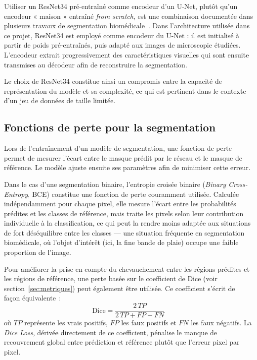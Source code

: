 \documentclass[12pt,a4paper]{report}
\begin{document}
Utiliser un ResNet34 pré-entraîné comme encodeur d'un U-Net, plutôt qu'un encodeur « maison » entraîné \textit{from scratch}, est une combinaison documentée dans plusieurs travaux de segmentation biomédicale~\cite{ref3,ref4}. Dans l'architecture utilisée dans ce projet, ResNet34 est employé comme encodeur du U-Net : il est initialisé à partir de poids pré-entraînés, puis adapté aux images de microscopie étudiées. L'encodeur extrait progressivement des caractéristiques visuelles qui sont ensuite transmises au décodeur afin de reconstruire la segmentation.

Le choix de ResNet34 constitue ainsi un compromis entre la capacité de représentation du modèle et sa complexité, ce qui est pertinent dans le contexte d'un jeu de données de taille limitée.

\subsection{Fonctions de perte pour la segmentation}

Lors de l'entraînement d'un modèle de segmentation, une fonction de perte permet de mesurer l'écart entre le masque prédit par le réseau et le masque de référence. Le modèle ajuste ensuite ses paramètres afin de minimiser cette erreur.

Dans le cas d'une segmentation binaire, l'entropie croisée binaire (\textit{Binary Cross-Entropy}, BCE) constitue une fonction de perte couramment utilisée. Calculée indépendamment pour chaque pixel, elle mesure l'écart entre les probabilités prédites et les classes de référence, mais traite les pixels selon leur contribution individuelle à la classification, ce qui peut la rendre moins adaptée aux situations de fort déséquilibre entre les classes — une situation fréquente en segmentation biomédicale, où l'objet d'intérêt (ici, la fine bande de plaie) occupe une faible proportion de l'image.

Pour améliorer la prise en compte du chevauchement entre les régions prédites et les régions de référence, une perte basée sur le coefficient de Dice (voir section~\ref{sec:metriques}) peut également être utilisée. Ce coefficient s'écrit de façon équivalente :
\[
\text{Dice} = \frac{2\,TP}{2\,TP + FP + FN}
\]
où $TP$ représente les vrais positifs, $FP$ les faux positifs et $FN$ les faux négatifs. La \textit{Dice Loss}, dérivée directement de ce coefficient, pénalise le manque de recouvrement global entre prédiction et référence plutôt que l'erreur pixel par pixel.
\end{document}
